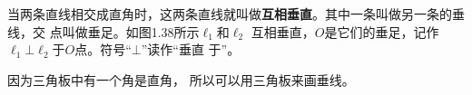 当两条直线相交成直角时，这两条直线就叫做\textbf{互相垂直}。其中一条叫做另一条的垂线，交
点叫做垂足。如图1.38所示$\ell_1$和$\ell_2$
互相垂直，$O$是它们的垂足，记作
$\ell_1\bot \ell_2$于$O$点。符号“$\bot$”读作“垂直
于”。

因为三角板中有一个角是直角，
所以可以用三角板来画垂线。






\begin{example}
	
\end{example}

\begin{solution}
	
\end{solution}


\begin{example}
	
\end{example}

\begin{solution}
    
\end{solution}


\begin{example}
	
\end{example}

\begin{solution}
    
\end{solution}

\begin{example}
	
\end{example}


\begin{solution}
    
\end{solution}


\begin{example}
    
\end{example}

\begin{solution}
    
\end{solution}


\begin{example}
    
\end{example}
\begin{solution}
    
\end{solution}


